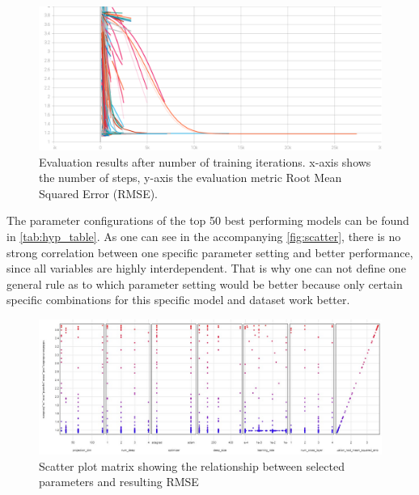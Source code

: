 \documentclass[10pt,final,journal,a4paper,oneside,twocolumn]{IEEEtran}
\begin{document}
\begin{figure}[ht]
    \centering
    \includegraphics[width=\linewidth]{hp_tuning_20220_evaluation_root_mean_squared_error_vs_iterations.pdf}
    \caption{Evaluation results after number of training iterations. x-axis shows the number of steps, y-axis the evaluation metric Root Mean Squared Error (RMSE).}
    \label{fig:rmse_it}
\end{figure}

The parameter configurations of the top 50 best performing models can be found in \autoref{tab:hyp_table}. As one can see in the accompanying \autoref{fig:scatter}, there is no strong correlation between one specific parameter setting and better performance, since all variables are highly interdependent. That is why one can not define one general rule as to which parameter setting would be better because only certain specific combinations for this specific model and dataset work better.

\begin{figure}[ht]
    \centering
    \includegraphics[width=\linewidth]{hparam_scatter.jpg}
    \caption{Scatter plot matrix showing the relationship between selected parameters and resulting RMSE}
    \label{fig:scatter}
\end{figure}
\end{document}
